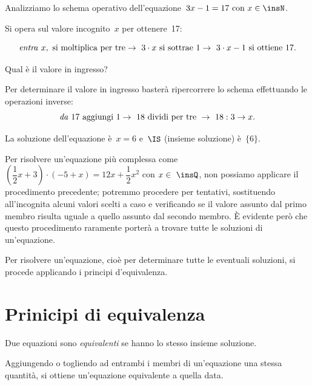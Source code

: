  \begin{esempio}
Analizziamo lo schema operativo dell'equazione~\(3x-1=17 \text{ con } 
x\in\insN\).

Si opera sul valore incognito~\(x\) per ottenere~17:

\[\text{\emph{entra} } x,\text{ si moltiplica per tre}\to~3\cdot x%
\text{ si sottrae } 1\to~3\cdot x-1 \text{ si ottiene } 17.\]

Qual è il valore in ingresso?

Per determinare il valore in ingresso basterà ripercorrere lo schema
 effettuando le operazioni inverse:
\[\text{\emph{da} } 17 \text{ aggiungi } 1\to~18 \text{ dividi per tre 
}\to~18:3 
\to x.\]

La soluzione dell'equazione è~\(x = 6\) e~\(\IS\) (insieme
soluzione) è~\(\{6\}\).
 \end{esempio}


Per risolvere un'equazione più complessa come
\(\left(\dfrac{1}{2}x+3\right)\cdot (-5+x)=12x+\dfrac{1}{2}x^{2}\) con
\(x\in~\insQ\), non possiamo applicare il procedimento precedente; potremmo
procedere per tentativi, sostituendo all'incognita
alcuni valori scelti a caso e verificando se il valore assunto dal
primo membro risulta uguale a quello assunto dal secondo membro. È
evidente però che questo procedimento raramente porterà a trovare
tutte le soluzioni di un'equazione.

\osservazione
Per risolvere un'equazione, cioè per determinare tutte
le eventuali soluzioni, si procede applicando i principi
d'equivalenza.

\section{Prinicipi di equivalenza}
\label{sec:13_principi}

\begin{definizione}
 Due equazioni sono \emph{equivalenti} se hanno lo stesso insieme soluzione.
\end{definizione}

\begin{principio}
Aggiungendo o togliendo ad entrambi i membri di un'equazione 
una stessa quantità, 
si ottiene un'equazione equivalente a quella data.
\end{principio}

